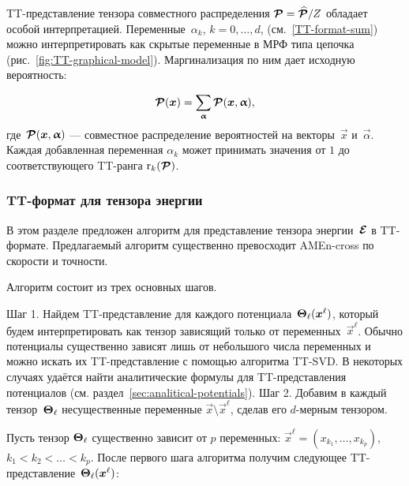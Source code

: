 TT\hyp{}представление тензора совместного распределения $\boldsymbol{\mathcal{P}} = \boldsymbol{\mathcal{\widehat{P}}} / Z$ обладает особой интерпретацией. Переменные~$\alpha_k$, $k=0,\ldots,d$, (см.~\eqref{TT-format-sum}) можно интерпретировать как скрытые переменные в МРФ типа цепочка (рис.~\ref{fig:TT-graphical-model}). Маргинализация по ним дает исходную вероятность:

\begin{equation}
\boldsymbol{\mathcal{P}}(\boldsymbol{x}) = \sum_{\boldsymbol{\upalpha}} \boldsymbol{\mathcal{P}}(\boldsymbol{x}, \boldsymbol{\upalpha}),
\end{equation}
где~$\boldsymbol{\mathcal{P}}(\boldsymbol{x}, \boldsymbol{\upalpha})$ --- совместное распределение вероятностей на векторы~$\vec{x}$ и~$\vec{\alpha}$.
Каждая добавленная переменная $\alpha_k$ может принимать значения от $1$ до соответствующего TT\hyp{}ранга $\operatorname{r}_k(\boldsymbol{\mathcal{P}})$.


\subsubsection{TT\hyp{}формат для тензора энергии}
\label{sec:energy-representation}

В этом разделе предложен алгоритм для представление тензора энергии~$\boldsymbol{\mathcal{E}}$ в TT\hyp{}формате. Предлагаемый алгоритм существенно превосходит AMEn-cross по скорости и точности.

Алгоритм состоит из трех основных шагов.

Шаг 1. Найдем TT\hyp{}представление для каждого потенциала~$\boldsymbol{\Theta}_\ell(\boldsymbol{x}^\ell)$, который будем интерпретировать как тензор зависящий только от переменных~$\vec{x}^\ell$. Обычно потенциалы существенно зависят лишь от небольшого числа переменных и можно искать их TT\hyp{}представление с помощью алгоритма TT-SVD.
 В некоторых случаях удаётся найти аналитические формулы для TT\hyp{}представления потенциалов (см. раздел~\ref{sec:analitical-potentials}).
Шаг 2. Добавим в каждый тензор~$\boldsymbol{\Theta}_\ell$ несущественные переменные $\vec{x} \setminus \vec{x}^\ell$, сделав его $d$-мерным тензором.

Пусть тензор $\boldsymbol{\Theta}_\ell$ существенно зависит от $p$ переменных: $\vec{x}^\ell = (x_{k_1}, \ldots, x_{k_p})$, $k_1 < k_2 < \ldots < k_p$. После первого шага алгоритма получим следующее TT\hyp{}представление~$\boldsymbol{\Theta}_\ell(\boldsymbol{x}^\ell)$:

